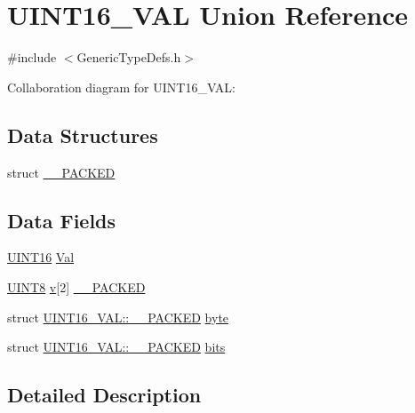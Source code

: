 \hypertarget{union_u_i_n_t16___v_a_l}{}\section{U\+I\+N\+T16\+\_\+\+V\+A\+L Union Reference}
\label{union_u_i_n_t16___v_a_l}


{\ttfamily \#include $<$Generic\+Type\+Defs.\+h$>$}



Collaboration diagram for U\+I\+N\+T16\+\_\+\+V\+A\+L\+:
\subsection*{Data Structures}
\begin{DoxyCompactItemize}
\item 
struct \hyperlink{struct_u_i_n_t16___v_a_l_1_1_____p_a_c_k_e_d}{\+\_\+\+\_\+\+P\+A\+C\+K\+E\+D}
\end{DoxyCompactItemize}
\subsection*{Data Fields}
\begin{DoxyCompactItemize}
\item 
\hyperlink{_generic_type_defs_8h_acfa284fa8026c4aace2728f7f15d6c13}{U\+I\+N\+T16} \hyperlink{union_u_i_n_t16___v_a_l_a39422387a9d2651da86ce4437ee8b5ab}{Val}
\item 
\hyperlink{_generic_type_defs_8h_ab27e9918b538ce9d8ca692479b375b6a}{U\+I\+N\+T8} \hyperlink{_s_p_i_flash_8c_a51a3fc6fe361f8f5a7a91799fecd2c9a}{v}\mbox{[}2\mbox{]} \hyperlink{union_u_i_n_t16___v_a_l_a7a1d2ea534b2031c6444c696032bd369}{\+\_\+\+\_\+\+P\+A\+C\+K\+E\+D}
\item 
struct \hyperlink{struct_u_i_n_t16___v_a_l_1_1_____p_a_c_k_e_d}{U\+I\+N\+T16\+\_\+\+V\+A\+L\+::\+\_\+\+\_\+\+P\+A\+C\+K\+E\+D} \hyperlink{union_u_i_n_t16___v_a_l_a5ef231687e0ec94aa497e688ce7fecbc}{byte}
\item 
struct \hyperlink{struct_u_i_n_t16___v_a_l_1_1_____p_a_c_k_e_d}{U\+I\+N\+T16\+\_\+\+V\+A\+L\+::\+\_\+\+\_\+\+P\+A\+C\+K\+E\+D} \hyperlink{union_u_i_n_t16___v_a_l_a075e0bdd9e1be60d2738b18a0e17c595}{bits}
\end{DoxyCompactItemize}


\subsection{Detailed Description}


